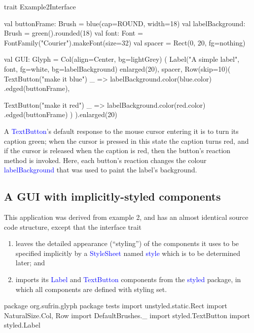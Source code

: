\documentclass[12pt,a4paper]{article}
\def\Scala#1{\textcolor{blue}{\textsf{#1}}}
\def\SS#1{\subsection{#1}}
\begin{document}
\begin{scala}
trait Example2Interface {
  val buttonFrame: Brush =
        blue(cap=ROUND, width=18)
  val labelBackground: Brush =
        green().rounded(18)
  val font: Font  =
        FontFamily("Courier").makeFont(size=32)
  val spacer =
      Rect(0, 20, fg=nothing)

  val GUI: Glyph = Col(align=Center, bg=lightGrey) (
    Label("A simple label", font,
          fg=white,
          bg=labelBackground) enlarged(20),
    spacer,
    Row(skip=10)(
        TextButton("make it blue")
           { _ => labelBackground.color(blue.color) }
           .edged(buttonFrame),
           
        TextButton("make it red")
           { _ => labelBackground.color(red.color) }
           .edged(buttonFrame)
    )
  ).enlarged(20)
}
\end{scala}

A \Scala{TextButton}'s default response to the mouse cursor entering
it is to turn its caption green; when the cursor is pressed in this
state the caption turns red, and if the cursor is released when the
caption is red, then the button's reaction method is invoked. Here,
each button's reaction changes the colour \Scala{labelBackground} that
was used to paint the label's background.

\begin{center}
\end{center}


\clearpage
\SS{A GUI with implicitly-styled components}

This application was derived from example 2, and has an almost
identical source code structure, except that the interface trait
\begin{enumerate}
\item leaves the detailed appearance (``styling'') of the
      components it uses to be specified implicitly by a
      \Scala{StyleSheet} named \Scala{style}
      which is to be determined later; and
\item imports its \Scala{Label} and \Scala{TextButton}
      components from the \Scala{styled} package, in which
      all components are defined with styling set. 
\end{enumerate}

\begin{scala}
package org.sufrin.glyph
package tests
import unstyled.static.Rect
import NaturalSize.{Col, Row}
import DefaultBrushes._
import styled.TextButton
import styled.Label
\end{scala}
\end{document}
